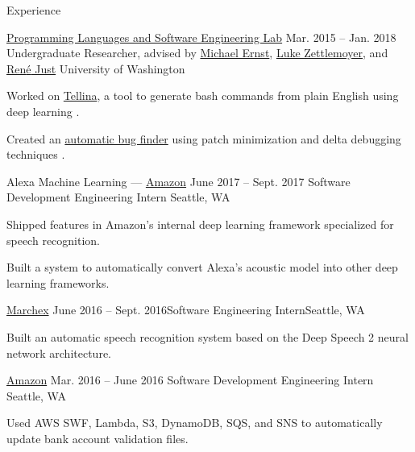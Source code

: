 \documentclass{resume}
\begin{document}
\begin{rSection}{Experience}
  \begin{rSubsection}{\href{https://uwplse.org/}
                           {Programming Languages and Software Engineering Lab}}
                     {Mar. 2015 -- Jan. 2018}
                     {Undergraduate Researcher, advised by
                       \href{https://homes.cs.washington.edu/~mernst/}
                            {Michael Ernst},
                       \href{https://www.cs.washington.edu/people/faculty/lsz}
                            {Luke Zettlemoyer},
                       and \href{https://people.cs.umass.edu/~rjust/}
                                {Ren{\'e} Just}}
                     {University of Washington}
  \item Worked on \href{https://github.com/TellinaTool}{Tellina}, a tool
    to generate bash commands from plain English using deep learning \citep{LinWPVZE2017:TR}.
  \item Created an \href{https://github.com/dericp/patch-minimization}
                        {automatic bug finder}
    using patch minimization and delta debugging techniques
    \citep{Pearson:2017:EIF:3097368.3097441}.
  \end{rSubsection}
  
  \begin{rSubsection}{Alexa Machine Learning ---
                       {\href{https://www.amazon.com/}{Amazon}}}
                     {June 2017 -- Sept. 2017}
                     {Software Development Engineering Intern}
                     {Seattle, WA}
    \item Shipped features in Amazon's internal deep learning framework
      specialized for speech recognition.
    \item Built a system to automatically convert Alexa's acoustic model into
      other deep learning frameworks.
  \end{rSubsection}

  \begin{rSubsection}{\href{http://www.marchex.com/}{Marchex}}
    {June 2016 -- Sept. 2016}{Software Engineering Intern}{Seattle, WA}
  \item Built an automatic speech recognition system based on the Deep Speech 2
    neural network architecture.
  \end{rSubsection}

  \begin{rSubsection}{\href{https://www.amazon.com/}{Amazon}}
                     {Mar. 2016 -- June 2016}
                     {Software Development Engineering Intern}
                     {Seattle, WA}
  \item Used AWS SWF, Lambda, S3, DynamoDB, SQS, and SNS to automatically update
    bank account validation files.
  \end{rSubsection}

\end{rSection}
\end{document}
